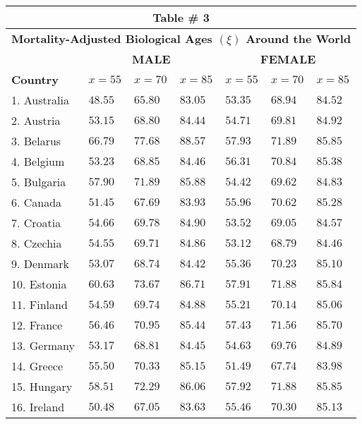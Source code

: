 \documentclass[12pt, titlepage]{article}%
\begin{document}
\clearpage\begin{longtable}{||
    p{95pt}|
    p{35pt}|
    p{35pt}|
    p{35pt}|
    p{35pt}|
    p{35pt}|
    p{35pt}
||}
\hline\hline
\multicolumn{7}{||c||}{Table \# 3 } \\ \hline\hline
\multicolumn{7}{||c||}{{\bf Mortality-Adjusted Biological Ages $(\xi)$ Around the World}}\\ \hline\hline
& \multicolumn{3}{|c|}{{\bf MALE}} &  \multicolumn{3}{|c||}{{\bf FEMALE}} \\ \hline \hline{\bf Country} & $x=55$ &  $x=70$ & $x=85$ & $x=55$ & $x=70$ & $x=85$ \\ \hline \hline
1. Australia & $48.55$ & $65.80$ & $83.05$ & $53.35$ & $68.94$ & $84.52$\\ \hline \hline
2. Austria & $53.15$ & $68.80$ & $84.44$ & $54.71$ & $69.81$ & $84.92$\\ \hline \hline
3. Belarus & $66.79$ & $77.68$ & $88.57$ & $57.93$ & $71.89$ & $85.85$\\ \hline \hline
4. Belgium & $53.23$ & $68.85$ & $84.46$ & $56.31$ & $70.84$ & $85.38$\\ \hline \hline
5. Bulgaria & $57.90$ & $71.89$ & $85.88$ & $54.42$ & $69.62$ & $84.83$\\ \hline \hline
6. Canada & $51.45$ & $67.69$ & $83.93$ & $55.96$ & $70.62$ & $85.28$\\ \hline \hline
7. Croatia & $54.66$ & $69.78$ & $84.90$ & $53.52$ & $69.05$ & $84.57$\\ \hline \hline
8. Czechia & $54.55$ & $69.71$ & $84.86$ & $53.12$ & $68.79$ & $84.46$\\ \hline \hline
9. Denmark & $53.07$ & $68.74$ & $84.42$ & $55.36$ & $70.23$ & $85.10$\\ \hline \hline
10. Estonia & $60.63$ & $73.67$ & $86.71$ & $57.91$ & $71.88$ & $85.84$\\ \hline \hline
11. Finland & $54.59$ & $69.74$ & $84.88$ & $55.21$ & $70.14$ & $85.06$\\ \hline \hline
12. France & $56.46$ & $70.95$ & $85.44$ & $57.43$ & $71.56$ & $85.70$\\ \hline \hline
13. Germany & $53.17$ & $68.81$ & $84.45$ & $54.63$ & $69.76$ & $84.89$\\ \hline \hline
14. Greece & $55.50$ & $70.33$ & $85.15$ & $51.49$ & $67.74$ & $83.98$\\ \hline \hline
15. Hungary & $58.51$ & $72.29$ & $86.06$ & $57.92$ & $71.88$ & $85.85$\\ \hline \hline
16. Ireland & $50.48$ & $67.05$ & $83.63$ & $55.46$ & $70.30$ & $85.13$\\ \hline \hline

\end{longtable}
\end{document}

